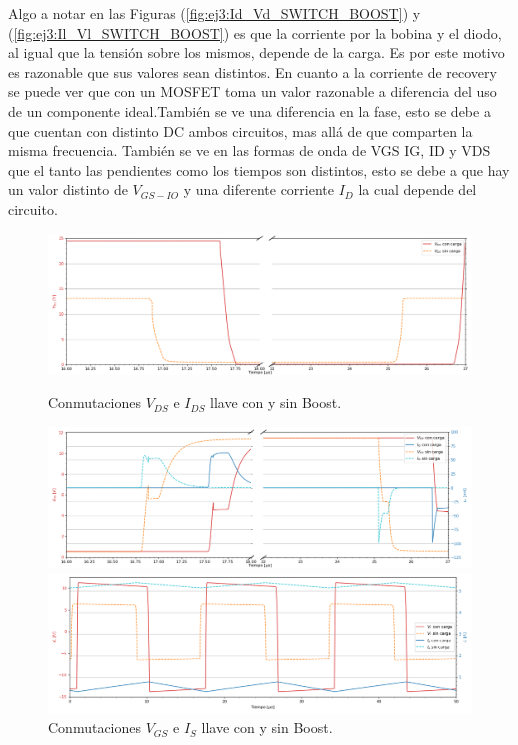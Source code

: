 Algo a notar en las Figuras (\ref{fig:ej3:Id_Vd_SWITCH_BOOST}) y (\ref{fig:ej3:Il_Vl_SWITCH_BOOST}) es que la corriente por la bobina y el diodo, al igual que la tensión sobre los mismos, depende de la carga. Es por este motivo es razonable que sus valores sean distintos. En cuanto a la corriente de recovery se puede ver que con un MOSFET toma un valor razonable a diferencia del uso de un componente ideal.También se ve una diferencia en la fase, esto se debe a que cuentan con distinto DC ambos circuitos, mas allá de que comparten la misma frecuencia. 
También se ve en las formas de onda de VGS IG, ID y VDS que el tanto las pendientes como los tiempos son distintos, esto se debe a que hay un valor distinto de $V_{GS-IO}$ y una diferente corriente $I_D$ la cual depende del circuito.
\begin{figure}
	\centering
	\begin{minipage}{0.495\textwidth}
		\centering
		\includegraphics[width=\linewidth]{ImagenesEjercicio-3/ids-vds-1v3}
		\caption{Conmutaciones $V_{DS}$ e  $I_{DS}$ llave con y sin Boost.}
		\label{fig:ej3:conmutacionON_OFF_VDS_IDS_SWITCH_BOOST}
	\end{minipage}\hfill
	\begin{minipage}{0.495\textwidth}
		\centering
		\includegraphics[width=\linewidth]{ImagenesEjercicio-3/ig-vgs-1v3}
		\caption{Conmutaciones $V_{GS}$ e  $I_{S}$ llave con y sin Boost.}
		\label{fig:ej3:conmutacionON_OFF_VGS_IG_SWITCH_BOOST}
	\end{minipage}\hfill
	\begin{minipage}{0.495\textwidth}
		\centering
		\includegraphics[width=\linewidth]{ImagenesEjercicio-3/il-vl-1v3}

\end{minipage}
\end{figure}
